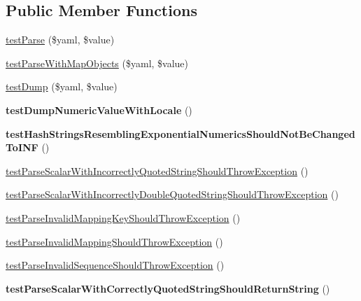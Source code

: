 \subsection*{Public Member Functions}
\begin{DoxyCompactItemize}
\item 
\hyperlink{classSymfony_1_1Component_1_1Yaml_1_1Tests_1_1InlineTest_a183b29dd444b4b591895b04e36635d82}{test\+Parse} (\$yaml, \$value)
\item 
\hyperlink{classSymfony_1_1Component_1_1Yaml_1_1Tests_1_1InlineTest_aac21592818e4be4f192ccdfae4b88694}{test\+Parse\+With\+Map\+Objects} (\$yaml, \$value)
\item 
\hyperlink{classSymfony_1_1Component_1_1Yaml_1_1Tests_1_1InlineTest_aa52221560dc93258520d3f5f53d54c21}{test\+Dump} (\$yaml, \$value)
\item 
{\bfseries test\+Dump\+Numeric\+Value\+With\+Locale} ()\hypertarget{classSymfony_1_1Component_1_1Yaml_1_1Tests_1_1InlineTest_ab44659e4bd71e7abdf8a4181168fdc6a}{}\label{classSymfony_1_1Component_1_1Yaml_1_1Tests_1_1InlineTest_ab44659e4bd71e7abdf8a4181168fdc6a}

\item 
{\bfseries test\+Hash\+Strings\+Resembling\+Exponential\+Numerics\+Should\+Not\+Be\+Changed\+To\+I\+NF} ()\hypertarget{classSymfony_1_1Component_1_1Yaml_1_1Tests_1_1InlineTest_a52ee30917ec6d9237a83104d15196d9c}{}\label{classSymfony_1_1Component_1_1Yaml_1_1Tests_1_1InlineTest_a52ee30917ec6d9237a83104d15196d9c}

\item 
\hyperlink{classSymfony_1_1Component_1_1Yaml_1_1Tests_1_1InlineTest_ad049fabbe57f213a9373f5c8c03c87eb}{test\+Parse\+Scalar\+With\+Incorrectly\+Quoted\+String\+Should\+Throw\+Exception} ()
\item 
\hyperlink{classSymfony_1_1Component_1_1Yaml_1_1Tests_1_1InlineTest_a82155ce0e01abe1e98a9f46d6a900d4b}{test\+Parse\+Scalar\+With\+Incorrectly\+Double\+Quoted\+String\+Should\+Throw\+Exception} ()
\item 
\hyperlink{classSymfony_1_1Component_1_1Yaml_1_1Tests_1_1InlineTest_a4eec2d10f4ab9b7bf6e60dbccf159540}{test\+Parse\+Invalid\+Mapping\+Key\+Should\+Throw\+Exception} ()
\item 
\hyperlink{classSymfony_1_1Component_1_1Yaml_1_1Tests_1_1InlineTest_af4e064760784aab8ca951abe2ae9bd0c}{test\+Parse\+Invalid\+Mapping\+Should\+Throw\+Exception} ()
\item 
\hyperlink{classSymfony_1_1Component_1_1Yaml_1_1Tests_1_1InlineTest_ae4887decf409652c3476d5cb26d688e2}{test\+Parse\+Invalid\+Sequence\+Should\+Throw\+Exception} ()
\item 
{\bfseries test\+Parse\+Scalar\+With\+Correctly\+Quoted\+String\+Should\+Return\+String} ()\hypertarget{classSymfony_1_1Component_1_1Yaml_1_1Tests_1_1InlineTest_abadb8865ad75d43b1b6dcbb0ae8a8d1d}{}\label{classSymfony_1_1Component_1_1Yaml_1_1Tests_1_1InlineTest_abadb8865ad75d43b1b6dcbb0ae8a8d1d}


\end{DoxyCompactItemize}
